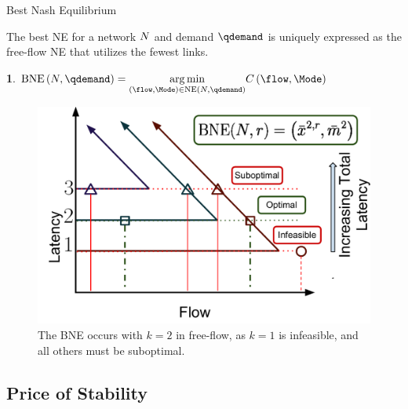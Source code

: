 \documentclass[xcolor=svgnames, english, smaller]{beamer}
\theoremstyle{plain}
\theoremstyle{definition}
\newtheorem{defn}[thm]{\protect\definitionname}
\theoremstyle{plain}
\theoremstyle{plain}
\providecommand{\definitionname}{Definition}
\begin{document}
\begin{frame}{Best Nash Equilibrium}

The best NE for a network $N$ and demand $\qdemand$ is uniquely
expressed as the free-flow NE that utilizes the fewest links.

\begin{defn}
$\BestNashEquilibrium{\NLinks}{\qdemand}=\underset{\left(\flow,\Mode\right)\in\NashEquilibrium{\NLinks}{\qdemand}}{\arg\min}\Latency\left(\flow,\Mode\right)$
\end{defn}

\begin{figure}
\begin{centering}
\includegraphics[scale=0.25]{../../figures/presentation/TheoremBestNashEquilibrium}
\par\end{centering}

\caption{The BNE occurs with $k=2$ in free-flow, as $k=1$ is infeasible,
and all others must be suboptimal.}
\end{figure}


\end{frame}

\subsection{Price of Stability}
\end{document}
